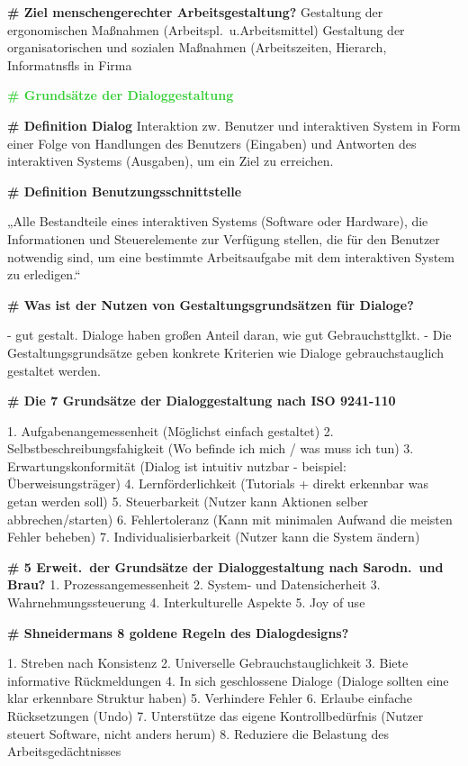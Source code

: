 \documentclass{article}
\begin{document}
\begin{multicols}{3}
\begin{flushleft}
\begin{tiny}
			\textbf{\# Ziel menschengerechter Arbeitsgestaltung?}
			Gestaltung der ergonomischen Maßnahmen (Arbeitspl.\
			u.Arbeitsmittel) Gestaltung der organisatorischen und sozialen
			Maßnahmen (Arbeitszeiten, Hierarch, Informatnsfls in Firma

			\textcolor{LimeGreen}{\textbf{\scriptsize{\# Grundsätze der
				Dialoggestaltung}}}

			\textbf{\# Definition Dialog}
			Interaktion zw. Benutzer und interaktiven System
			in Form einer Folge von Handlungen des Benutzers (Eingaben) und
			Antworten des interaktiven Systems (Ausgaben), um ein Ziel zu
			erreichen.

			\textbf{\# Definition Benutzungsschnittstelle}

			„Alle Bestandteile eines interaktiven Systems (Software oder
			Hardware), die Informationen und Steuerelemente zur Verfügung
			stellen, die für den Benutzer notwendig sind, um eine bestimmte
			Arbeitsaufgabe mit dem interaktiven System zu erledigen.“

			\textbf{\# Was ist der Nutzen von Gestaltungsgrundsätzen für
				Dialoge?}

			- gut gestalt. Dialoge haben großen Anteil daran, wie gut
			  Gebrauchsttglkt.
			- Die Gestaltungsgrundsätze geben konkrete Kriterien wie Dialoge
			  gebrauchstauglich gestaltet werden.

			\textbf{\# Die 7 Grundsätze der Dialoggestaltung nach
				ISO 9241-110}

			1. Aufgabenangemessenheit (Möglichst einfach gestaltet)
			2. Selbstbeschreibungsfahigkeit (Wo befinde ich mich / was muss ich
			   tun)
			3. Erwartungskonformität (Dialog ist intuitiv nutzbar - beispiel:
			   Überweisungsträger)
			4. Lernförderlichkeit (Tutorials + direkt erkennbar was getan
			   werden soll)
			5. Steuerbarkeit (Nutzer kann Aktionen selber abbrechen/starten)
			6. Fehlertoleranz (Kann mit minimalen Aufwand die meisten Fehler
			   beheben)
			7. Individualisierbarkeit (Nutzer kann die System ändern)

			\textbf{\# 5 Erweit.\ der Grundsätze der Dialoggestaltung
				nach Sarodn.\ und Brau?}
			1. Prozessangemessenheit
			2. System- und Datensicherheit
			3. Wahrnehmungssteuerung
			4. Interkulturelle Aspekte
			5. Joy of use

			\textbf{\# Shneidermans 8 goldene Regeln des
				Dialogdesigns?}

			1. Streben nach Konsistenz
			2. Universelle Gebrauchstauglichkeit
			3. Biete informative Rückmeldungen
			4. In sich geschlossene Dialoge (Dialoge sollten eine klar
			   erkennbare Struktur haben)
			5. Verhindere Fehler
			6. Erlaube einfache Rücksetzungen (Undo)
			7. Unterstütze das eigene Kontrollbedürfnis (Nutzer steuert
			   Software, nicht anders herum)
			8. Reduziere die Belastung des Arbeitsgedächtnisses


\end{tiny}
\end{flushleft}
\end{multicols}
\end{document}

